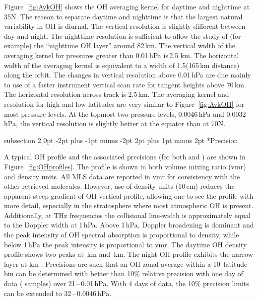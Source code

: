 \documentclass[11pt,draft]{report}
\makeatletter
\renewcommand{\subsection}{\@startsection%
  {subsection}%
  {2}%
  {0pt}%
  {-2pt plus -1pt minus -2pt}%
  {2pt plus 1pt minus 2pt}%
  {\large\sffamily\fontseries{sb}\selectfont\flushleft\color{SectionColor}\figureversion{tabular}}}%
\makeatother
\begin{document}
Figure~\ref{fig:AvkOH} shows the OH averaging kernel for daytime and
nighttime at 35\degsym N. The reason to separate daytime and nighttime
is that the largest natural variability in OH is diurnal. The vertical
resolution is slightly different between day and night. The nighttime
resolution is sufficient to allow the study of (for example) the
``nighttime OH layer'' around 82\,km.  The vertical width of the
averaging kernel for pressures greater than 0.01\,hPa is\,2.5 km.  The
horizontal width of the averaging kernel is equivalent to a width of
1.5\degsym (165\,km distance) along the orbit.  The changes in vertical
resolution above 0.01\,hPa are due mainly to use of a faster instrument
vertical scan rate for tangent heights above 70\,km.  The horizontal
resolution across track is 2.5\,km. The averaging kernel and resolution
for high and low latitudes are very similar to Figure~\ref{fig:AvkOH}
for most pressure levels.  At the topmost two pressure levels,
0.0046\,hPa and 0.0032\,hPa, the vertical resolution is slightly better
at the equator than at 70\degsym N.

\subsection*{Precision}

A typical OH profile and the associated precisions (for both \prevv and
\thisv) are shown in Figure~\ref{fig:OHprofiles}. The profile is shown in
both volume mixing ratio (vmr) and density units. All MLS data are
reported in vmr for consistency with the other retrieved molecules.
However, use of density units (10\,cm) reduces the
apparent steep gradient of OH vertical profile, allowing one to see the
profile with more detail, especially in the stratosphere where most
atmospheric OH is present.  Additionally, at THz frequencies the
collisional line-width is approximately equal to the Doppler width at
1\,hPa. Above 1\,hPa, Doppler broadening is dominant and the peak
intensity of OH spectral absorption is proportional to density, while
below 1\,hPa the peak intensity is proportional to vmr. The daytime OH
density profile shows two peaks at \,km and \,km. The
night OH profile exhibits the narrow layer at  km
\citep{PickettEtal06niteOH}. Precisions are such that an OH zonal
average within a 10\degsym\ latitude bin can be determined with better
than 10\% relative precision with one day of data ( samples)
over 21\,--\,0.01\,hPa. With 4 days of data, the 10\% precision limits
can be extended to 32\,--\,0.0046\,hPa.
\end{document}
